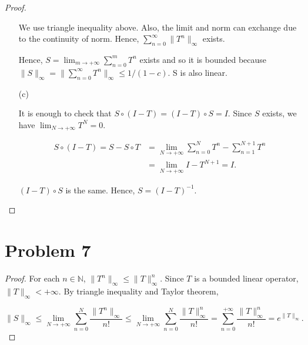 \documentclass[12pt]{article}
\begin{document}
\begin{proof}
\begin{enumerate}
We use triangle inequality above. Also, the limit and norm can exchange due to the continuity of norm. Hence, $\sum_{n=0}^\infty\|T^n\|_\infty$ exists.

Hence, $S = \lim_{m\rightarrow +\infty} \sum_{n=0}^m T^n$ exists and so it is bounded because $\|S\|_\infty = \|\sum_{n=0}^\infty T^n \|_\infty \leqslant 1/(1-c)$. S is also linear.

\item [(c)]

It is enough to check that $S\circ (I-T) = (I-T)\circ S = I$. Since $S$ exists, we have $\lim_{N\rightarrow +\infty} T^{N} = 0$.

$$
\begin{aligned}
S\circ(I-T) = S - S\circ T & = \lim_{N\rightarrow +\infty}\sum_{n=0}^N T^n - \sum_{n=1}^{N+1} T^n \\
& = \lim_{N\rightarrow +\infty} I - T^{N+1} = I.
\end{aligned}
$$


$(I - T)\circ S$ is the same. Hence, $S = (I - T)^{-1}$.

\end{enumerate}
\end{proof}

\section*{Problem 7}

\begin{proof}

For each $n\in\mathbb N$, $\|T^n\|_\infty \leqslant \|T\|^n_\infty$. Since $T$ is a bounded linear operator, $\|T\|_\infty < +\infty$. By triangle inequality and Taylor theorem, 

$$
\|S\|_\infty \leqslant \lim_{N\rightarrow +\infty} \sum_{n=0}^{N}\frac{\|T^n\|_\infty}{n!} \leqslant \lim_{N\rightarrow +\infty} \sum_{n=0}^{N} \frac{\|T\|^n_\infty}{n!} = \sum_{n=0}^{+\infty}\frac{\|T\|^n_\infty}{n!} =  e^{\| T\|_\infty}.
$$

\end{proof}
\end{document}
